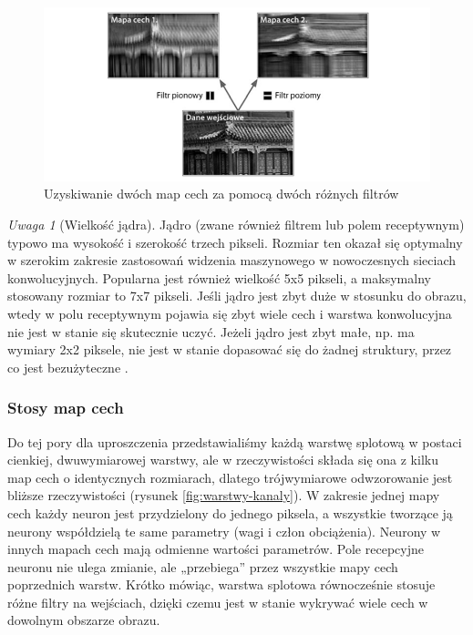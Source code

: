 \documentclass[12pt]{mwbk}
\theoremstyle{plain}
\theoremstyle{definition}
\theoremstyle{remark}
\newtheorem{uwaga}{Uwaga}[chapter]
\newcommand\zrodlo[1]{\par\vspace{-3mm}{\small\textit{Źródło: }#1 }}
\begin{document}
\begin{figure}[!h]
	\centering
	\includegraphics[width=0.9\linewidth]{rys/cnn_filtry.png}
	\caption{Uzyskiwanie dwóch map cech za pomocą dwóch różnych filtrów}
	\zrodlo{\cite{geron}}
	\label{fig:filtry}
\end{figure}

\begin{uwaga}[Wielkość jądra]
	Jądro (zwane również filtrem lub polem receptywnym) typowo ma wysokość i szerokość trzech pikseli. Rozmiar ten okazał się optymalny w szerokim zakresie zastosowań widzenia maszynowego w nowoczesnych sieciach konwolucyjnych. Popularna jest również wielkość 5x5 pikseli, a maksymalny stosowany rozmiar to 7x7 pikseli. Jeśli jądro jest zbyt duże w stosunku do obrazu, wtedy w polu receptywnym pojawia się zbyt wiele cech i warstwa konwolucyjna nie jest w stanie się skutecznie uczyć. Jeżeli jądro jest zbyt małe, np. ma wymiary 2x2 piksele, nie jest w stanie dopasować się do żadnej struktury, przez co jest bezużyteczne \cite{illustrated}.
\end{uwaga}

\subsubsection{Stosy map cech}

Do tej pory dla uproszczenia przedstawialiśmy każdą warstwę splotową w postaci cienkiej, dwuwymiarowej warstwy, ale w rzeczywistości składa się ona z kilku map cech o identycznych rozmiarach, dlatego trójwymiarowe odwzorowanie jest bliższe rzeczywistości (rysunek \ref{fig:warstwy-kanaly}). W zakresie jednej mapy cech każdy neuron jest przydzielony do jednego piksela, a wszystkie tworzące ją neurony współdzielą te same parametry (wagi i człon obciążenia). Neurony w innych mapach cech mają odmienne wartości parametrów. Pole recepcyjne neuronu nie ulega zmianie, ale „przebiega” przez
wszystkie mapy cech poprzednich warstw. Krótko mówiąc, warstwa splotowa równocześnie stosuje
różne filtry na wejściach, dzięki czemu jest w stanie wykrywać wiele cech w dowolnym obszarze obrazu.
\end{document}
